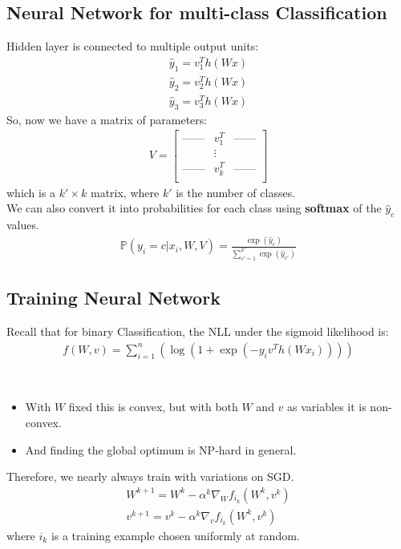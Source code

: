 \subsection{Neural Network for multi-class Classification} \label{sec:}
Hidden layer is connected to multiple output units:
\begin{align*}
    \hat{y}_1 = v_1^{T} h(Wx)
    \\\hat{y}_2 = v_2^{T} h(Wx)
    \\\hat{y}_3 = v_3^{T} h(Wx)
\end{align*}
So, now we have a matrix of parameters:
\begin{align*}
    V = \begin{bmatrix}
     \text{------} & v_1^{T} & \text{------} \\
      & \vdots &  \\
    \text{------}  & v_k^{T} & \text{------} \\
    \end{bmatrix}
\end{align*}
which is a $k' \times  k$ matrix, where $k'$ is the number of classes.
\\ We can also convert it into probabilities for each class using \textbf{softmax} of the $\hat{y}_c$ values.
\begin{align*}
    \mathbb{P}(y_i = c | x_i,W,V) = \frac{\exp(\hat{y}_c)}{\sum\limits_{c' = 1}^{k'} \exp(\hat{y}_{c'})}
\end{align*}

\subsection{Training Neural Network} \label{sec:}
Recall that for binary Classification, the NLL under the sigmoid likelihood is:
\begin{align*}
    f(W,v) = \sum\limits_{i=1}^{n} (\log(1 + \exp(-y_i v^{T}h(Wx_i))))
\end{align*}
\begin{remark} ~
\begin{itemize}
    \item With $W$ fixed this is convex, but with both $W$ and $v$ as variables it is non-convex.
    \item And finding the global optimum is NP-hard in general.
\end{itemize}
\end{remark}
Therefore, we nearly always train with variations on SGD.
\begin{align*}
    W^{k+1} = W^{k} - \alpha^{k} \nabla_W f_{i_k}(W^{k},v^{k})
    \\ v^{k+1} = v^{k} - \alpha^{k} \nabla_v f_{i_k}(W^{k},v^{k})
\end{align*}
where $i_k$ is a training example chosen uniformly at random.

